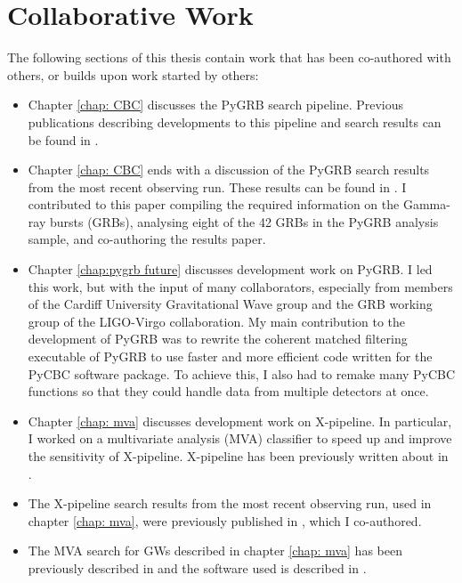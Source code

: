 \documentclass[11pt]{cuthesis}
\newcommand{\xp}{X-pipeline }
\newcommand{\xpfs}{X-pipeline. }
\begin{document}
\chapter*{Collaborative Work}
The following sections of this thesis contain work that has been co-authored with others, or builds upon work started by others:
\begin{itemize}
\item Chapter \ref{chap: CBC} discusses the PyGRB search pipeline. Previous publications describing developments to this pipeline and search results can be found in \cite{pygrb_harry,pygrb_Williamson:2014,o1grb}.
\item Chapter \ref{chap: CBC} ends with a discussion of the PyGRB search results from the most recent observing run. These results can be found in \cite{o2grb}. I contributed to this paper compiling the required information on the Gamma-ray bursts (GRBs), analysing eight of the 42 GRBs in the PyGRB analysis sample, and co-authoring the results paper.
\item Chapter \ref{chap:pygrb future} discusses development work on PyGRB. I led this work, but with the input of many collaborators, especially from members of the Cardiff University Gravitational Wave group and the GRB working group of the LIGO-Virgo collaboration. My main contribution to the development of PyGRB was to rewrite the coherent matched filtering executable of PyGRB to use faster and more efficient code written for the PyCBC software package. To achieve this, I also had to remake many PyCBC functions so that they could handle data from multiple detectors at once. 
\item Chapter \ref{chap: mva} discusses development work on \xpfs In particular, I worked on a multivariate analysis (MVA) classifier to speed up and improve the sensitivity of \xpfs \xp has been previously written about in \cite{xpipeline,was_xpipeline}. 
\item The \xp search results from the most recent observing run, used in chapter \ref{chap: mva}, were previously published in \cite{o2grb}, which I co-authored. 
\item The MVA search for GWs described in chapter \ref{chap: mva} has been previously described in \cite{adams_mva} and the software used is described in \cite{tmva_guide}.  
\end{itemize}

\mainmatter
\end{document}
